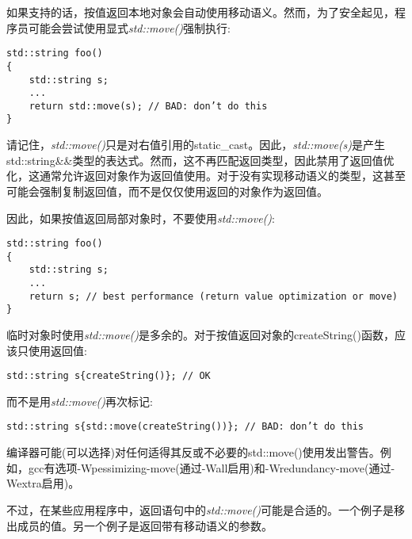 如果支持的话，按值返回本地对象会自动使用移动语义。然而，为了安全起见，程序员可能会尝试使用显式\textit{std::move()}强制执行:\par

\begin{lstlisting}[caption={}]
std::string foo()
{
	std::string s;
	...
	return std::move(s); // BAD: don’t do this
}
\end{lstlisting}

请记住，\textit{std::move()}只是对右值引用的static\_cast。因此，\textit{std::move(s)}是产生std::string\&\&类型的表达式。然而，这不再匹配返回类型，因此禁用了返回值优化，这通常允许返回对象作为返回值使用。对于没有实现移动语义的类型，这甚至可能会强制复制返回值，而不是仅仅使用返回的对象作为返回值。\par

因此，如果按值返回局部对象时，不要使用\textit{std::move()}:\par

\begin{lstlisting}[caption={}]
std::string foo()
{
	std::string s;
	...
	return s; // best performance (return value optimization or move)
}
\end{lstlisting}

临时对象时使用\textit{std::move()}是多余的。对于按值返回对象的createString()函数，应该只使用返回值:\par

\begin{lstlisting}[caption={}]
std::string s{createString()}; // OK
\end{lstlisting}

而不是用\textit{std::move()}再次标记:\par

\begin{lstlisting}[caption={}]
std::string s{std::move(createString())}; // BAD: don’t do this
\end{lstlisting}

编译器可能(可以选择)对任何适得其反或不必要的std::move()使用发出警告。例如，gcc有选项-Wpessimizing-move(通过-Wall启用)和-Wredundancy-move(通过-Wextra启用)。\par

不过，在某些应用程序中，返回语句中的\textit{std::move()}可能是合适的。一个例子是移出成员的值。另一个例子是返回带有移动语义的参数。\par
















